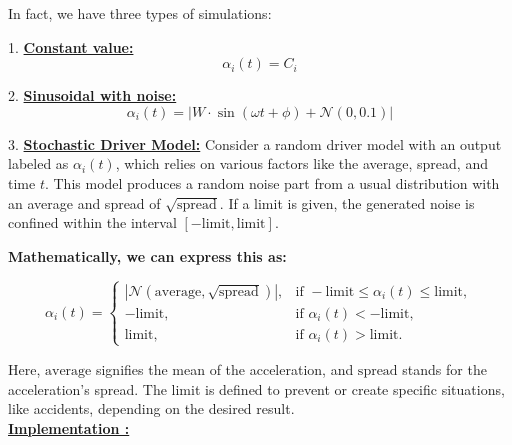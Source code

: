 \documentclass{article}
\begin{document}
			In fact, we have three types of simulations:
			
			1. \textbf{\underline{Constant value:}}
			\[
			\alpha_i(t) = C_i
			\]
			
			2. \textbf{\underline{Sinusoidal with noise:}}
			\[
			\alpha_i(t) = \left| W \cdot \sin(\omega t + \phi) + \mathcal{N}(0, 0.1) \right|
			\]
			
			3. \textbf{\underline{Stochastic Driver Model:}} \newline \newline
			Consider a random driver model with an output labeled as \( \alpha_i(t) \), which relies on various factors like the average, spread, and time \( t \). This model produces a random noise part from a usual distribution with an average and spread of \( \sqrt{\text{spread}} \). If a limit is given, the generated noise is confined within the interval \([- \text{limit}, \text{limit}]\). \newline \newline
			
			\textbf{Mathematically, we can express this as:}
		
			
			\[
			\alpha_i(t) =
			\begin{cases}
				\left| \mathcal{N}(\text{average}, \sqrt{\text{spread}}) \right|, & \text{if } -\text{limit} \leq \alpha_i(t) \leq \text{limit}, \\
				-\text{limit}, & \text{if } \alpha_i(t) < -\text{limit}, \\
				\text{limit}, & \text{if } \alpha_i(t) > \text{limit}.
			\end{cases}
			\]
			
			Here, \( \text{average} \) signifies the mean of the acceleration, and \( \text{spread} \) stands for the acceleration's spread. The limit is defined to prevent or create specific situations, like accidents, depending on the desired result. \\
			
			
			\textbf{\underline{Implementation : }}
			
\end{document}

